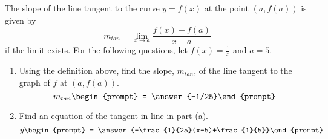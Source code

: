 \documentclass{ximera}
\author{Matthew Carr}
\begin{document}
\begin{exercise}



The slope of the line tangent to the curve $y=f(x)$ at the point $(a,f(a))$ is given by 
\[
m_{tan}=\lim_{x\to a}\frac{f(x)-f(a)}{x-a}
\]
if the limit exists. For the following questions, let $f(x)=\frac{1}{x}$ and $a=5$.

\begin{enumerate}
\item		Using the definition above, find the slope, $m_{tan}$, of the line tangent to the graph of $f$ at $(a,f(a))$. \[m_{tan}\begin{prompt} = \answer{-1/25}\end{prompt}\]
\item		Find an equation of the tangent in line in part (a). \[y\begin{prompt} = \answer{-\frac{1}{25}(x-5)+\frac{1}{5}}\end{prompt}\]
\end{enumerate}

\end{exercise}
\end{document}
